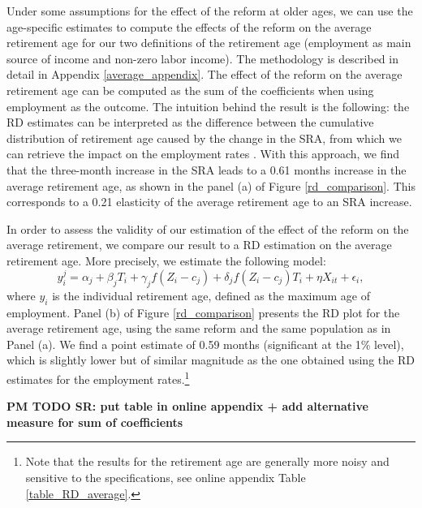 \documentclass[12pt,a4paper]{article}
\begin{document}
Under some assumptions for the effect of the reform at older ages, we can use the age-specific estimates to compute the effects of the reform on the average retirement age for our two definitions of the retirement age (employment as main source of income and non-zero labor income). The methodology is described in detail in Appendix \ref{average_appendix}. The effect of the reform on the average retirement age can be computed as the sum of the coefficients when using employment as the outcome. The intuition behind the result is the following: the RD estimates can be interpreted as the difference between the cumulative distribution of retirement age caused by the change in the SRA, from which we can retrieve the impact on the employment rates \citep[see also][]{mastrobuoni_labor_2009}. With this approach, we find that the three-month increase in the SRA leads to a 0.61 months increase in the average retirement age, as shown in the panel (a) of Figure \ref{rd_comparison}. This corresponds to a 0.21 elasticity of the average retirement age to an SRA increase. 

In order to assess the validity of our estimation of the effect of the reform on the average retirement, we compare our result to a RD estimation on the average retirement age. More precisely, we estimate the following model: 
\begin{equation}
	\label{eq_RD_average}
	y_{i}^j = \alpha_j  + \beta_j  T_{i} + \gamma_j f(Z_{i} - c_j)  + \delta_j f(Z_{i} - c_j) T_{i} + \eta X_{it} + \epsilon_{i},
\end{equation}
\noindent where $y_i$ is the individual retirement age, defined as the maximum age of employment. %
Panel (b) of Figure \ref{rd_comparison} presents the RD plot for the average retirement age, using the same reform and the same population as in Panel (a). We find a point estimate of 0.59 months (significant at the 1\% level),
which is slightly lower but of similar magnitude as the one obtained using the RD estimates for the employment rates.\footnote{Note that the results for the retirement age are generally more noisy and sensitive to the specifications, see online appendix Table \ref{table_RD_average}.} 

\textbf{PM TODO SR: put table in online appendix + add alternative measure for sum of coefficients}
\end{document}
